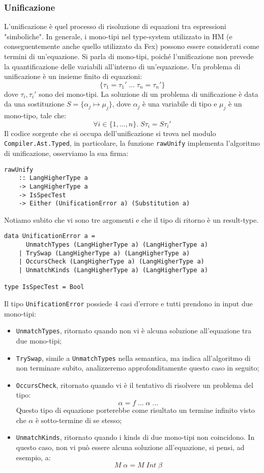\documentclass[10pt,a4paper]{article}
\begin{document}
\subsubsection{Unificazione}
L'unificazione è quel processo di risoluzione di equazioni tra espressioni "simboliche". In generale, i mono-tipi nel
type-system utilizzato in HM (e conseguentemente anche quello utilizzato da Fex) possono essere considerati come
termini di un'equazione. Si parla di mono-tipi, poiché l'unificazione non prevede la quantificazione delle variabili
all'interno di un'equazione. Un problema di unificazione è un insieme finito di equazioni:
\[ \{ \tau_1 = \tau_1' \; ... \; \tau_n = \tau_n' \} \]
dove $ \tau_i, \tau_i' $ sono dei mono-tipi. La soluzione di un problema di unificazione è data da una sostituzione
$ S = \{ \alpha_j \mapsto \mu_j \} $, dove $ \alpha_j $ è una variabile di tipo e $ \mu_j $ è un mono-tipo, tale che:
\[ \forall i \in \{1, ..., n\}. \; S\tau_i = S\tau_i' \]
Il codice sorgente che si occupa dell'unificazione si trova nel modulo \texttt{Compiler.Ast.Typed}, in particolare,
la funzione \texttt{rawUnify} implementa l'algoritmo di unificazione, osserviamo la sua firma:
\begin{lstlisting}
rawUnify
    :: LangHigherType a
    -> LangHigherType a
    -> IsSpecTest
    -> Either (UnificationError a) (Substitution a)
\end{lstlisting}
Notiamo subito che vi sono tre argomenti e che il tipo di ritorno è un result-type.
\begin{lstlisting}
data UnificationError a =
      UnmatchTypes (LangHigherType a) (LangHigherType a)
    | TrySwap (LangHigherType a) (LangHigherType a)
    | OccursCheck (LangHigherType a) (LangHigherType a)
    | UnmatchKinds (LangHigherType a) (LangHigherType a)

type IsSpecTest = Bool
\end{lstlisting}
Il tipo \texttt{UnificationError} possiede 4 casi d'errore e tutti prendono in input due mono-tipi:
\begin{itemize}
    \item \texttt{UnmatchTypes}, ritornato quando non vi è alcuna soluzione all'equazione tra due mono-tipi;
    \item \texttt{TrySwap}, simile a \texttt{UnmatchTypes} nella semantica, ma indica all'algoritmo di non terminare
    subito, analizzeremo approfonditamente questo caso in seguito;
    \item \texttt{OccursCheck}, ritornato quando vi è il tentativo di risolvere un problema del tipo:
        \[ \alpha = f \; ... \; \alpha \; ...  \]
    Questo tipo di equazione porterebbe come risultato un termine infinito visto che $ \alpha $ è sotto-termine di
    se stesso;
    \item \texttt{UnmatchKinds}, ritornato quando i kinds di due mono-tipi non coincidono. In questo caso, non vi
    può essere alcuna soluzione all'equazione, si pensi, ad esempio, a:
        \[ M \; \alpha = M \; Int \; \beta \]
\end{itemize}
\end{document}
